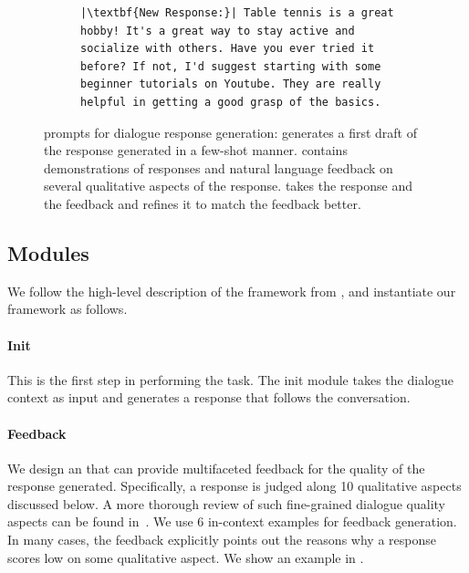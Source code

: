 \begin{figure}[t]
\begin{subfigure}[T]{0.98\textwidth}
\begin{verbatim}
|\textbf{New Response:}| Table tennis is a great hobby! It's a great way to stay active and socialize with others. Have you ever tried it before? If not, I'd suggest starting with some beginner tutorials on Youtube. They are really helpful in getting a good grasp of the basics.
        \end{verbatim}
    \end{subfigure}

\caption{\ours prompts for dialogue response generation: \initmod generates a first draft of the response generated in a few-shot manner. \fbmod contains demonstrations of responses and natural language feedback on several qualitative aspects of the response. \itermod  takes the response and the feedback and refines it to match the feedback better.}
    \label{fig:response:autofb}
\end{figure}



\subsection{Modules}

We follow the high-level description of the framework from , and instantiate our framework as follows.

\paragraph{Init} This is the first step in performing the task. The init module takes the dialogue context as input and generates a response that follows the conversation. 

\paragraph{Feedback} We design an \fbmod that can provide multifaceted feedback for the quality of the response generated. Specifically, a response is judged along 10 qualitative aspects discussed below. A more thorough review of such fine-grained dialogue quality aspects can be found in~\citet{mehri-eskenazi-2020-unsupervised}. We use 6 in-context examples for feedback generation. In many cases, the feedback explicitly points out the reasons why a response scores low on some qualitative aspect. We show an example in .

